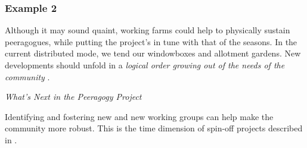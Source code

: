 \subsubsection*{Example 2} Although it may sound quaint, working farms could help to physically
sustain peeragogues, while putting the project's  in tune with that of the seasons.  In the
current distributed mode, we tend our windowboxes and allotment gardens.   New developments
should unfold in a \emph{logical order growing out of the needs of the community} \cite[Chapter IX]{washington1986up}.

\begin{framed}
\noindent 
\emph{What's Next in the Peeragogy Project}
\begin{collectinmacro}{\HeartbeatWN}{}{}
Identifying and fostering new  and new working groups can help make the community more robust.  This is the time dimension of spin-off projects described in .
\end{collectinmacro}
\HeartbeatWN
\end{framed}

\newpage
